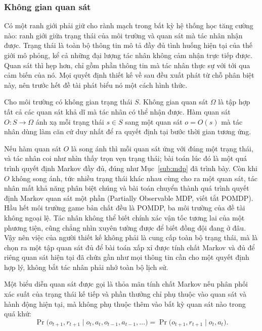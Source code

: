 \subsubsection{Không gian quan sát}
\label{sub:obs-space}
\indent Có một ranh giới phải giữ cho rành mạch trong bất kỳ hệ thống học tăng cường nào:
ranh giới giữa trạng thái của môi trường và quan sát mà tác nhân nhận được. Trạng thái là
toàn bộ thông tin mô tả đầy đủ tình huống hiện tại của thế giới mô phỏng, kể cả những đại
lượng tác nhân không cảm nhận trực tiếp được. Quan sát thì hẹp hơn, chỉ gồm phần thông tin
mà tác nhân thực sự với tới qua cảm biến của nó. Mọi quyết định thiết kế về sau đều xuất
phát từ chỗ phân biệt này, nên trước hết đề tài phát biểu nó một cách hình thức.

\begin{dn}
\label{dn:obs}
Cho môi trường có không gian trạng thái $S$. Không gian quan sát $\Omega$ là tập hợp
tất cả các quan sát khả dĩ mà tác nhân có thể nhận được. Hàm quan sát
$O: S \to \Omega$ ánh xạ mỗi trạng thái $s \in S$ sang một quan sát $o = O(s)$ mà tác
nhân dùng làm căn cứ duy nhất để ra quyết định tại bước thời gian tương ứng.
\end{dn}

\indent Nếu hàm quan sát $O$ là song ánh thì mỗi quan sát ứng với đúng một trạng thái, và
tác nhân coi như nhìn thấy trọn vẹn trạng thái; bài toán lúc đó là một quá trình quyết
định Markov đầy đủ, đúng như Mục~\ref{sub:mdp} đã trình bày. Còn khi $O$ không song
ánh, tức nhiều trạng thái khác nhau cùng cho ra một quan sát, tác nhân mất khả năng phân
biệt chúng và bài toán chuyển thành quá trình quyết định Markov quan sát một phần
(Partially Observable MDP, viết tắt POMDP). Hầu hết môi trường game bản chất đều là POMDP, ba môi trường của đề
tài không ngoại lệ. Tác nhân không thể biết chính xác vận tốc
tương lai của một phương tiện, cũng chẳng nhìn xuyên tường được để biết đồng đội đang ở
đâu. Vậy nên việc của người thiết kế không phải là cung cấp toàn bộ trạng thái, mà là chọn
ra một tập quan sát đủ để bài toán xấp xỉ được tính chất Markov và đủ để riêng quan sát
hiện tại đã chứa gần như mọi thông tin cần cho một quyết định hợp lý, không bắt tác nhân
phải nhớ toàn bộ lịch sử.

\begin{dn}
\label{dn:markov-obs}
Một biểu diễn quan sát được gọi là thỏa mãn tính chất Markov nếu phân phối xác suất
của trạng thái kế tiếp và phần thưởng chỉ phụ thuộc vào quan sát và hành động hiện tại,
mà không phụ thuộc thêm vào bất kỳ quan sát nào trong quá khứ:
\[
\Pr\bigl(o_{t+1}, r_{t+1} \mid o_t, a_t, o_{t-1}, a_{t-1}, \dots\bigr)
= \Pr\bigl(o_{t+1}, r_{t+1} \mid o_t, a_t\bigr).
\]
\end{dn}

